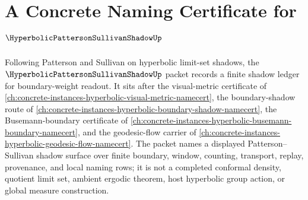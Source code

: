 \chapter{A Concrete Naming Certificate for $\HyperbolicPattersonSullivanShadowUp$}
\label{ch:concrete-instances-hyperbolic-patterson-sullivan-shadow-namecert}

Following Patterson and Sullivan on hyperbolic limit-set shadows, the $\HyperbolicPattersonSullivanShadowUp$ packet records a finite shadow ledger for boundary-weight readout. It sits after the visual-metric certificate of \autoref{ch:concrete-instances-hyperbolic-visual-metric-namecert}, the boundary-shadow route of \autoref{ch:concrete-instances-hyperbolic-boundary-shadow-namecert}, the Busemann-boundary certificate of \autoref{ch:concrete-instances-hyperbolic-busemann-boundary-namecert}, and the geodesic-flow carrier of \autoref{ch:concrete-instances-hyperbolic-geodesic-flow-namecert}. The packet names a displayed Patterson--Sullivan shadow surface over finite boundary, window, counting, transport, replay, provenance, and local naming rows; it is not a completed conformal density, quotient limit set, ambient ergodic theorem, host hyperbolic group action, or global measure construction.

